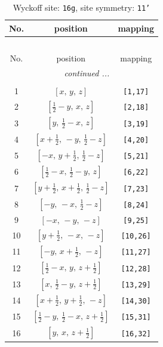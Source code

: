 \documentclass[fleqn,8pt]{jsarticle}
\begin{document}
\begin{longtable}{ccc}
\caption{Wyckoff site: {\tt 16g}, site symmetry: {\tt 11'}}
 \\
 \hline \hline
No. & position & mapping \\ \hline \endfirsthead

\multicolumn{2}{l}{\tablename\ \thetable{}} \\
 \hline \hline
No. & position & mapping \\ \hline \endhead

 \hline \hline
\multicolumn{2}{r}{\footnotesize\it continued ...} \\ \endfoot

 \hline \hline
\multicolumn{2}{r}{} \\ \endlastfoot

1 & $\left[ x,\, y,\, z \right]$ & {\tt [1,17]} \\ \hline
2 & $\left[ \frac{1}{2} - y,\, x,\, z \right]$ & {\tt [2,18]} \\ \hline
3 & $\left[ y,\, \frac{1}{2} - x,\, z \right]$ & {\tt [3,19]} \\ \hline
4 & $\left[ x + \frac{1}{2},\, - y,\, \frac{1}{2} - z \right]$ & {\tt [4,20]} \\ \hline
5 & $\left[ - x,\, y + \frac{1}{2},\, \frac{1}{2} - z \right]$ & {\tt [5,21]} \\ \hline
6 & $\left[ \frac{1}{2} - x,\, \frac{1}{2} - y,\, z \right]$ & {\tt [6,22]} \\ \hline
7 & $\left[ y + \frac{1}{2},\, x + \frac{1}{2},\, \frac{1}{2} - z \right]$ & {\tt [7,23]} \\ \hline
8 & $\left[ - y,\, - x,\, \frac{1}{2} - z \right]$ & {\tt [8,24]} \\ \hline
9 & $\left[ - x,\, - y,\, - z \right]$ & {\tt [9,25]} \\ \hline
10 & $\left[ y + \frac{1}{2},\, - x,\, - z \right]$ & {\tt [10,26]} \\ \hline
11 & $\left[ - y,\, x + \frac{1}{2},\, - z \right]$ & {\tt [11,27]} \\ \hline
12 & $\left[ \frac{1}{2} - x,\, y,\, z + \frac{1}{2} \right]$ & {\tt [12,28]} \\ \hline
13 & $\left[ x,\, \frac{1}{2} - y,\, z + \frac{1}{2} \right]$ & {\tt [13,29]} \\ \hline
14 & $\left[ x + \frac{1}{2},\, y + \frac{1}{2},\, - z \right]$ & {\tt [14,30]} \\ \hline
15 & $\left[ \frac{1}{2} - y,\, \frac{1}{2} - x,\, z + \frac{1}{2} \right]$ & {\tt [15,31]} \\ \hline
16 & $\left[ y,\, x,\, z + \frac{1}{2} \right]$ & {\tt [16,32]} \\
\end{longtable}
\end{document}
